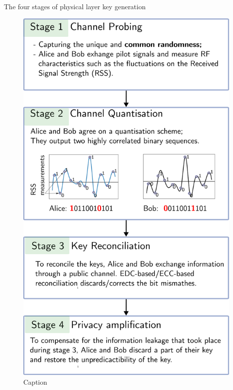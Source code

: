 \begin{frame}{The four stages of physical layer key generation}
    
\begin{figure}
    \centering
    \includegraphics[scale = 0.215]{slides/figures/PLKG.eps}
    \caption{Caption}
    \label{fig:PLKG}
\end{figure}
\end{frame}

